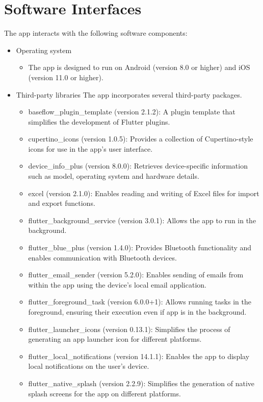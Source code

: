 \documentclass[a4paper]{scrreprt}
\begin{document}
\section{Software Interfaces}
The app interacts with the following software components:
\begin{itemize}
    \item Operating system
    \begin{itemize}
        \item The app is designed to run on Android (version 8.0 or higher) and iOS (version 11.0 or higher).
    \end{itemize}
    \item Third-party libraries
    The app incorporates several third-party packages.
    \begin{itemize}
        \item baseflow\_plugin\_template (version 2.1.2): A plugin template that simplifies the development of Flutter plugins.
        \item cupertino\_icons (version 1.0.5): Provides a collection of Cupertino-style icons for use in the app's user interface.
        \item device\_info\_plus (version 8.0.0): Retrieves device-specific information such as model, operating system and hardware details.
        \item excel (version 2.1.0): Enables reading and writing of Excel files for import and export functions.
        \item flutter\_background\_service (version 3.0.1): Allows the app to run in the background.
        \item flutter\_blue\_plus (version 1.4.0): Provides Bluetooth functionality and enables communication with Bluetooth devices.
        \item flutter\_email\_sender (version 5.2.0): Enables sending of emails from within the app using the device's local email application.
        \item flutter\_foreground\_task (version 6.0.0+1): Allows running tasks in the foreground, ensuring their execution even if app is in the background.
        \item flutter\_launcher\_icons (version 0.13.1): Simplifies the process of generating an app launcher icon for different platforms.
        \item flutter\_local\_notifications (version 14.1.1): Enables the app to display local notifications on the user's device.
        \item flutter\_native\_splash (version 2.2.9): Simplifies the generation of native splash screens for the app on different platforms.

\end{itemize}
\end{itemize}
\end{document}
